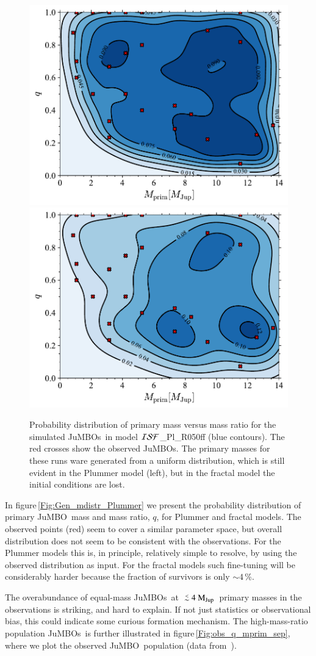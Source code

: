 \documentclass[submission,phys]{lib/SciPost}
\newcommand{\MJup}{\mbox{$\mathrm{{M}}_{\rm Jup}$}}
\def\aplt{\ {\raise-.5ex\hbox{$\buildrel<\over\sim$}}\ }
\newcommand{\jumbo}{\mbox{JuMBO}}
\newcommand{\jumbos}{\mbox{JuMBOs}}
\begin{document}
\begin{figure}
    \centering
    \includegraphics[width=0.49\columnwidth]{figures/Plummer_rvir0.5_FF_mass_distr.pdf}
    \includegraphics[width=0.49\columnwidth]{figures/Fractal_rvir0.5_FF_mass_distr.pdf}
    \caption{Probability distribution of primary mass versus mass
      ratio for the simulated \jumbos\, in model ${\cal
        ISF}$\_Pl\_R050ff (blue contours).  The red crosses show the
      observed \jumbos.  The primary masses for these runs ware
      generated from a uniform distribution, which is still evident in
      the Plummer model (left), but in the fractal model the initial
      conditions are lost.  }
         \label{Fig:Gen_mdistr_Plummer}
         \label{Fig:Gen_mdistr_Fractal}
\end{figure}

In figure\,\ref{Fig:Gen_mdistr_Plummer} we present the probability
distribution of primary \jumbo\, mass and mass ratio, $q$, for Plummer
and fractal models.  The observed points (red) seem to cover a similar
parameter space, but overall distribution does not seem to be
consistent with the observations. For the Plummer models this is, in
principle, relatively simple to resolve, by using the observed
distribution as input. For the fractal models such fine-tuning will be
considerably harder because the fraction of survivors is only $\sim
4$\,\%.

The overabundance of equal-mass \jumbos\, at $\aplt 4$\,\MJup\,
primary masses in the observations is striking, and hard to
explain. If not just statistics or observational bias, this could
indicate some curious formation mechanism. The high-mass-ratio
population \jumbos\, is further illustrated in
figure\,\ref{Fig:obs_q_mprim_sep}, where we plot the observed \jumbo\,
population (data from \,\cite{2023arXiv231001231P}).
\end{document}

